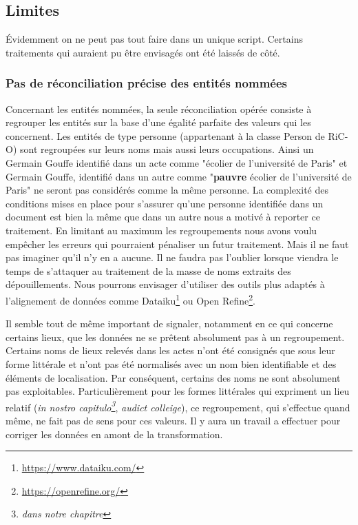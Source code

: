 \subsection{Limites}
Évidemment on ne peut pas tout faire dans un unique script. Certains traitements qui auraient pu être envisagés ont été laissés de côté. 

\subsubsection{Pas de réconciliation précise des entités nommées}
Concernant les entités nommées, la seule réconciliation opérée consiste à regrouper les entités sur la base d'une égalité parfaite des valeurs qui les concernent. Les entités de type personne (appartenant à la classe Person de RiC-O) sont regroupées sur leurs noms mais aussi leurs occupations. Ainsi un \og Germain Gouffe \fg identifié dans un acte comme "écolier de l'université de Paris" et \og Germain Gouffe\fg, identifié dans un autre comme "\textbf{pauvre} écolier de l'université de Paris" ne seront pas considérés comme la même personne. La complexité des conditions mises en place pour s'assurer qu'une personne identifiée dans un document est bien la même que dans un autre nous a motivé à reporter ce traitement. En limitant au maximum les regroupements nous avons voulu empêcher les erreurs qui pourraient pénaliser un futur traitement. Mais il ne faut pas imaginer qu'il n'y en a aucune. Il ne faudra pas l'oublier lorsque viendra le temps de s'attaquer au traitement de la masse de noms extraits des dépouillements. Nous pourrons envisager d'utiliser des outils plus adaptés à l'alignement de données comme Dataiku\footnote{\href{https://www.dataiku.com/}{https://www.dataiku.com/}} ou Open Refine\footnote{\href{https://openrefine.org/}{https://openrefine.org/}}.
\par
Il semble tout de même important de signaler, notamment en ce qui concerne certains lieux, que les données ne se prêtent absolument pas à un regroupement. Certains noms de lieux relevés dans les actes n'ont été consignés que sous leur forme littérale et n'ont pas été normalisés avec un nom bien identifiable et des éléments de localisation. Par conséquent, certains des noms ne sont absolument pas exploitables. Particulièrement pour les formes littérales qui expriment un lieu relatif (\textit{in nostro capitulo\footnote{\textit{dans notre chapitre}}}, \textit{audict colleige}), ce regroupement, qui s'effectue quand même, ne fait pas de sens pour ces valeurs. Il y aura un travail a effectuer pour corriger les données en amont de la transformation.
